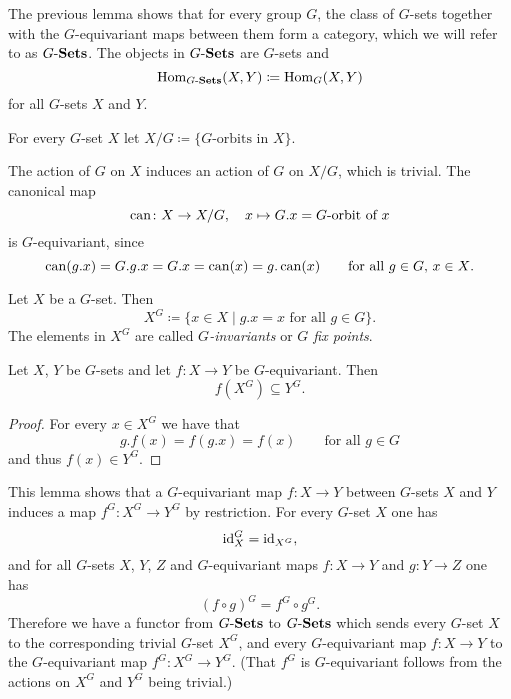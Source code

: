 The previous lemma shows that for every group $G$, the class of $G$-sets together with the $G$-equivariant maps between them form a category, which we will refer to as $G\text{-}\mathbf{Sets}$.
The objects in $G\text{-}\mathbf{Sets}$ are $G$-sets and
\[
            \operatorname{Hom}_{G\text{-}\mathbf{Sets}}(X,Y)
  \coloneqq \operatorname{Hom}_G(X,Y)
\]
for all $G$-sets $X$ and $Y$.


\begin{defi}
  For every $G$-set $X$ let $X/G \coloneqq \{ \text{$G$-orbits in $X$} \}$.
\end{defi}


\begin{note}
  The action of $G$ on $X$ induces an action of $G$ on $X/G$, which is trivial.
  The canonical map
  \[
            \operatorname{can}
    \colon  X \to X/G,
    \quad   x
    \mapsto G.x
    =       \text{$G$-orbit of $x$}
  \]
  is $G$-equivariant, since
  \[
      \operatorname{can}(g.x)
    = G.g.x
    = G.x
    = \operatorname{can}(x)
    = g.\operatorname{can}(x)
    \qquad
    \text{for all $g \in G$, $x \in X$}.
  \]
\end{note}


\begin{defi}
  Let $X$ be a $G$-set.
  Then
  \[
              X^G
    \coloneqq \{
                x \in X
              \mid
                \text{$g.x = x$ for all $g \in G$}
              \}.
  \]
  The elements in $X^G$ are called \emph{$G$-invariants} or \emph{$G$ fix points}.
\end{defi}


\begin{lem}
  Let $X$, $Y$ be $G$-sets and let $f \colon X \to Y$ be $G$-equivariant.
  Then
  \[
              f\left( X^G \right)
    \subseteq Y^G.
  \]
\end{lem}
\begin{proof}
  For every $x \in X^G$ we have that
  \[
      g.f(x)
    = f(g.x)
    = f(x)
    \qquad
    \text{for all $g \in G$}
  \]
  and thus $f(x) \in Y^G$.
\end{proof}


This lemma shows that a $G$-equivariant map $f \colon X \to Y$ between $G$-sets $X$ and $Y$ induces a map $f^G \colon X^G \to Y^G$ by restriction.
For every $G$-set $X$ one has
\[
    \operatorname{id}_X^G
  = \operatorname{id}_{X^G},
\]
and for all $G$-sets $X$, $Y$, $Z$ and $G$-equivariant maps $f \colon X \to Y$ and $g \colon Y \to Z$ one has
\[
    (f \circ g)^G
  = f^G \circ g^G.
\]
Therefore we have a functor from $G\text{-}\mathbf{Sets}$ to $G\text{-}\mathbf{Sets}$ which sends every $G$-set $X$ to the corresponding trivial $G$-set $X^G$, and every $G$-equivariant map $f \colon X \to Y$ to the $G$-equivariant map $f^G \colon X^G \to Y^G$.
(That $f^G$ is $G$-equivariant follows from the actions on $X^G$ and $Y^G$ being trivial.)


